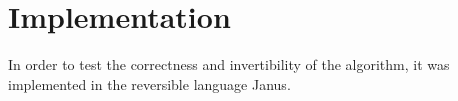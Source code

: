 \section{Implementation}

In order to test the correctness and invertibility of the algorithm,
it was implemented in the reversible language Janus\cite{janus2007}.
